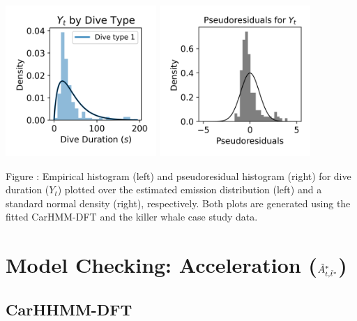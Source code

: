 \documentclass{article}
\begin{document}
        \begin{center}
        \includegraphics[width=2.25in]{../Plots/2019/20190902-182840-CATs_OB_1_0_267_CarHMM_empirical_hist_dive_duration.png}
        \includegraphics[width=2.25in]{../Plots/2019/20190902-182840-CATs_OB_1_0_267_CarHMM_pseudresids_Dive_Duration.png}
        \end{center}
        
        \noindent Figure : Empirical histogram (left) and pseudoresidual histogram (right) for dive duration ($Y_{t}$) plotted over the estimated emission distribution (left) and a standard normal density (right), respectively. Both plots are generated using the fitted CarHMM-DFT and the killer whale case study data.
        \addtocounter{fignum}{1}
        
    \newpage
    \section{Model Checking: Acceleration ($\tilde{A}^*_{t,\tilde t^*}$)}
        
        \subsection{CarHHMM-DFT}
        
\end{document}
